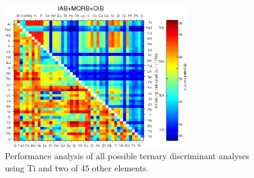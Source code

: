 \begin{figure}[htbp]
  \includegraphics[width=300]{figures/xPlotTrace3Ti_linear_err.jpg}
  \caption[Performance  analysis of  all possible  ternary  discriminant analyses
using Ti and other elements]
{Performance  analysis of  all possible  ternary  discriminant analyses
using Ti and two of 45 other elements.}
  \label{fig:trace3lin}
\end{figure}

